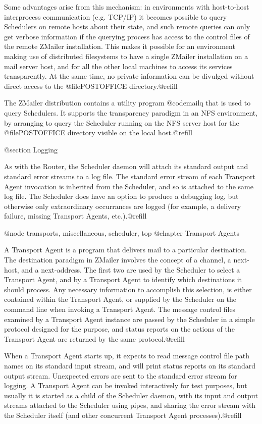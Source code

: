 {{Some advantages arise from this mechanism: in environments with host-to-host
interprocess communication (e.g. TCP/IP) it becomes possible to query
Schedulers on remote hosts about their state, and such remote queries can
only get verbose information if the querying process has access to the
control files of the remote ZMailer installation.  This makes it possible for
an environment making use of distributed filesystems to have a single ZMailer
installation on a mail server host, and for all the other local machines to
access its services transparently.  At the same time, no private information
can be divulged without direct access to the @file{POSTOFFICE} directory.@refill

The ZMailer distribution contains a utility program @code{mailq} that is used
to query Schedulers.  It supports the transparency paradigm in an
NFS environment, by arranging to query the Scheduler running on the NFS
server host for the @file{POSTOFFICE} directory visible on the local
host.@refill

@section Logging

As with the Router, the Scheduler daemon will attach its standard output and
standard error streams to a log file.  The standard error stream of each
Transport Agent invocation is inherited from the Scheduler, and so is
attached to the same log file.  The Scheduler does have an option to produce
a debugging log, but otherwise only extraordinary occurrances are logged
(for example, a delivery failure, missing Transport Agents, etc.).@refill

@node transports, miscellaneous, scheduler, top
@chapter Transport Agents

A Transport Agent is a program that delivers mail to a particular
destination.  The destination paradigm in ZMailer involves the concept of a
channel, a next-host, and a next-address.  The first two are used by the
Scheduler to select a Transport Agent, and by a Transport Agent to identify
which destinations it should process.  Any necessary information to
accomplish this selection, is either contained within the Transport Agent, or
supplied by the Scheduler on the command line when invoking a Transport
Agent.  The message control files examined by a Transport Agent instance are
passed by the Scheduler in a simple protocol designed for the purpose, and
status reports on the actions of the Transport Agent are returned by the same
protocol.@refill

When a Transport Agent starts up, it expects to read message control file
path names on its standard input stream, and will print status reports on
its standard output stream.  Unexpected errors are sent to the standard error
stream for logging.  A Transport Agent can be invoked interactively for test
purposes, but usually it is started as a child of the Scheduler daemon, with
its input and output streams attached to the Scheduler using pipes, and
sharing the error stream with the Scheduler itself (and other concurrent
Transport Agent processes).@refill

}}
